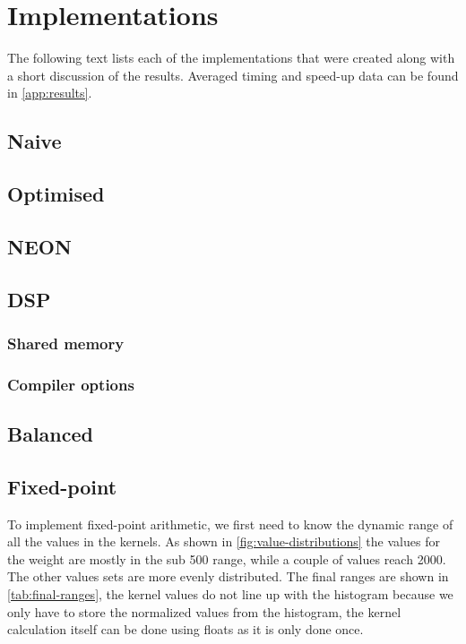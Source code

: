 \documentclass[final]{article}
\begin{document}
\section{Implementations}
\label{sec:implementations}

The following text lists each of the implementations that were created along with a short discussion of the results. Averaged timing and speed-up data can be found in \cref{app:results}.

\subsection{Naive}


\subsection{Optimised}




\subsection{NEON}


\subsection{DSP}

\subsubsection{Shared memory}

\subsubsection{Compiler options}


\subsection{Balanced}

\subsection{Fixed-point}
To implement fixed-point arithmetic, we first need to know the dynamic range of all the values in the kernels.
As shown in \cref{fig:value-distributions} the values for the weight are mostly in the sub \num{500} range, while a couple of values reach \num{2000}. 
The other values sets are more evenly distributed.
The final ranges are shown in \cref{tab:final-ranges}, the kernel values do not line up with the histogram because we only have to store the normalized values from the histogram, the kernel calculation itself can be done using floats as it is only done once.
\end{document}

